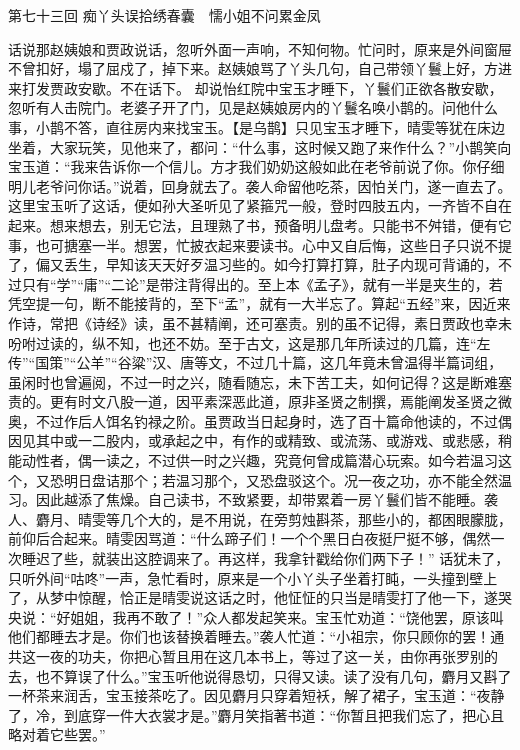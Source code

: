 \documentclass[12pt,oneside]{book}
\begin{document}
第七十三回  痴丫头误拾绣春囊　懦小姐不问累金凤


话说那赵姨娘和贾政说话，忽听外面一声响，不知何物。忙问时，原来是外间窗屉不曾扣好，塌了屈戍了，掉下来。赵姨娘骂了丫头几句，自己带领丫鬟上好，方进来打发贾政安歇。不在话下。
却说怡红院中宝玉才睡下，丫鬟们正欲各散安歇，忽听有人击院门。老婆子开了门，见是赵姨娘房内的丫鬟名唤小鹊的。问他什么事，小鹊不答，直往房内来找宝玉。【是乌鹊】只见宝玉才睡下，晴雯等犹在床边坐着，大家玩笑，见他来了，都问：“什么事，这时候又跑了来作什么？”小鹊笑向宝玉道：“我来告诉你一个信儿。方才我们奶奶这般如此在老爷前说了你。你仔细明儿老爷问你话。”说着，回身就去了。袭人命留他吃茶，因怕关门，遂一直去了。
这里宝玉听了这话，便如孙大圣听见了紧箍咒一般，登时四肢五内，一齐皆不自在起来。想来想去，别无它法，且理熟了书，预备明儿盘考。只能书不舛错，便有它事，也可搪塞一半。想罢，忙披衣起来要读书。心中又自后悔，这些日子只说不提了，偏又丢生，早知该天天好歹温习些的。如今打算打算，肚子内现可背诵的，不过只有“学”“庸”“二论”是带注背得出的。至上本《孟子》，就有一半是夹生的，若凭空提一句，断不能接背的，至下“孟”，就有一大半忘了。算起“五经”来，因近来作诗，常把《诗经》读，虽不甚精阐，还可塞责。别的虽不记得，素日贾政也幸未吩咐过读的，纵不知，也还不妨。至于古文，这是那几年所读过的几篇，连“左传”“国策”“公羊”“谷粱”汉、唐等文，不过几十篇，这几年竟未曾温得半篇词组，虽闲时也曾遍阅，不过一时之兴，随看随忘，未下苦工夫，如何记得？这是断难塞责的。更有时文八股一道，因平素深恶此道，原非圣贤之制撰，焉能阐发圣贤之微奥，不过作后人饵名钓禄之阶。虽贾政当日起身时，选了百十篇命他读的，不过偶因见其中或一二股内，或承起之中，有作的或精致、或流荡、或游戏、或悲感，稍能动性者，偶一读之，不过供一时之兴趣，究竟何曾成篇潜心玩索。如今若温习这个，又恐明日盘诘那个；若温习那个，又恐盘驳这个。况一夜之功，亦不能全然温习。因此越添了焦燥。自己读书，不致紧要，却带累着一房丫鬟们皆不能睡。袭人、麝月、晴雯等几个大的，是不用说，在旁剪烛斟茶，那些小的，都困眼朦胧，前仰后合起来。晴雯因骂道：“什么蹄子们！一个个黑日白夜挺尸挺不够，偶然一次睡迟了些，就装出这腔调来了。再这样，我拿针戳给你们两下子！”
话犹未了，只听外间“咕咚”一声，急忙看时，原来是一个小丫头子坐着打盹，一头撞到壁上了，从梦中惊醒，恰正是晴雯说这话之时，他怔怔的只当是晴雯打了他一下，遂哭央说：“好姐姐，我再不敢了！”众人都发起笑来。宝玉忙劝道：“饶他罢，原该叫他们都睡去才是。你们也该替换着睡去。”袭人忙道：“小祖宗，你只顾你的罢！通共这一夜的功夫，你把心暂且用在这几本书上，等过了这一关，由你再张罗别的去，也不算误了什么。”宝玉听他说得恳切，只得又读。读了没有几句，麝月又斟了一杯茶来润舌，宝玉接茶吃了。因见麝月只穿着短袄，解了裙子，宝玉道：“夜静了，冷，到底穿一件大衣裳才是。”麝月笑指著书道：“你暂且把我们忘了，把心且略对着它些罢。”
\end{document}
